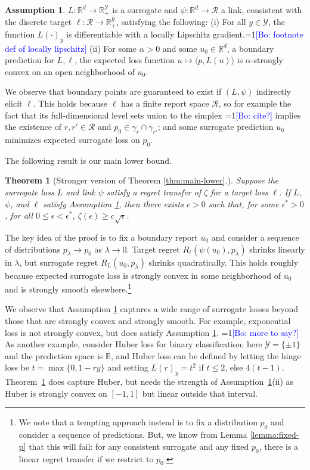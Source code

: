 \documentclass{article}
\newtheorem{theorem}{Theorem}
\theoremstyle{definition}\newtheorem{definition}{Definition}
\theoremstyle{definition}\newtheorem{assumption}{Assumption}
\newcommand{\Comments}{0}
\newcommand{\mynote}[2]{\ifnum\Comments=1\textcolor{#1}{#2}\fi}
\newcommand{\bo}[1]{\mynote{blue}{[Bo: #1]}}
\newcommand{\reals}{\mathbb{R}}
\newcommand{\R}{\mathcal{R}}
\newcommand{\Y}{\mathcal{Y}}
\newcommand{\inprod}[2]{\langle #1, #2 \rangle}%
\begin{document}
\begin{assumption} \label{assumption:lower}
  $L: \reals^d \to \reals^{\Y}_+$ is a surrogate and $\psi: \reals^d \to \R$ a link, consistent with the discrete target $\ell: \R \to \reals^{\Y}_+$, satisfying the following: (i) For all $y \in \Y$, the function $L(\cdot)_y$ is differentiable with a locally Lipschitz gradient.\bo{footnote def of locally lipschitz} (ii) For some $\alpha > 0$ and some $u_0 \in \reals^d$, a boundary prediction for $L,\ell$, the expected loss function $u \mapsto \inprod{p}{L(u)}$ is $\alpha$-strongly convex on an open neighborhood of $u_0$.
\end{assumption}

We observe that boundary points are guaranteed to exist if $(L,\psi)$ indirectly elicit $\ell$.
This holds because $\ell$ has a finite report space $\R$, so for example the fact that its full-dimensional level sets union to the simplex \bo{cite?} implies the existence of $r,r' \in \R$ and $p_0 \in \gamma_r \cap \gamma_{r'}$; and some surrogate prediction $u_0$ minimizes expected surrogate loss on $p_0$.

The following result is our main lower bound.
\begin{theorem}[Stronger version of Theorem \ref{thm:main-lower}.] \label{thm:main-lower-details}
  Suppose the surrogate loss $L$ and link $\psi$ satisfy a regret transfer of $\zeta$ for a target loss $\ell$.
  If $L$, $\psi$, and $\ell$ satisfy Assumption \ref{assumption:lower}, then there exists $c > 0$ such that, for some $\epsilon^* > 0$, for all $0 \leq \epsilon < \epsilon^*$, $\zeta(\epsilon) \geq c \sqrt{\epsilon}$.
\end{theorem}
The key idea of the proof is to fix a boundary report $u_0$ and consider a sequence of distributions $p_{\lambda} \to p_0$ as $\lambda \to 0$.
Target regret $R_{\ell}(\psi(u_0),p_{\lambda})$ shrinks linearly in $\lambda$, but surrogate regret $R_L(u_0,p_{\lambda})$ shrinks quadratically.
This holds roughly because expected surrogate loss is strongly convex in some neighborhood of $u_0$ and is strongly smooth elsewhere.\footnote{We note that a tempting approach instead is to fix a distribution $p_0$ and consider a sequence of predictions. But, we know from Lemma \ref{lemma:fixed-p} that this will fail: for any consistent surrogate and any fixed $p_0$, there is a linear regret transfer if we restrict to $p_0$.}

We observe that Assumption \ref{assumption:lower} captures a wide range of surrogate losses beyond those that are strongly convex and strongly smooth.
For example, exponential loss is not strongly convex, but does satisfy Assumption \ref{assumption:lower}. \bo{more to say?}
As another example, consider Huber loss for binary classification;
here $\Y = \{\pm 1\}$ and the prediction space is $\reals$, and Huber loss can be defined by letting the hinge loss be $t = \max\{0, 1-ry\}$ and setting $L(r)_y = t^2$ if $t \leq 2$, else $4(t-1)$.
Theorem~\ref{thm:main-lower-details} does capture Huber, but needs the strength of Assumption~\ref{assumption:lower}(ii) as Huber is strongly convex on $[-1,1]$ but linear outside that interval. 
\end{document}

